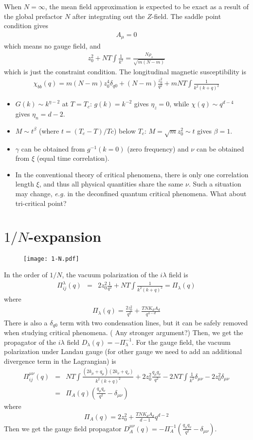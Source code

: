\documentclass[aps,notitlepage]{revtex4-1}
\newcommand{\bea}{\begin{eqnarray}}
\newcommand{\eea}{\end{eqnarray}}
\begin{document}
When $N=\infty$, the mean field approximation is expected to be exact as a result of the global prefactor $N$ after integrating out the $Z$-field. The saddle point condition gives 
\bea A_\mu=0 \eea which means no gauge field, and 
\bea z_0^2 + NT\int \frac{1}{k^2} = \frac{N\rho_s}{\sqrt{m(N-m)}} \eea
which is just the constraint condition.
The longitudinal magnetic susceptibility is
\bea \chi_{bb}(q)= m(N-m) z_0^4\delta_{q0} + (N-m)\frac{z_0^2}{q^2} + mNT\int \frac{1}{k^2(k+q)^2} \eea




\begin{itemize}
	\item $G(k)\sim k^{\eta-2}$ at $T=T_c$: $g(k)=k^{-2}$ gives $\eta_z=0$, while $\chi(q)\sim q^{d-4}$ gives $\eta_n=d-2$.
	\item $M\sim t^\beta$ (where $t=(T_c-T)/Tc$) below $T_c$: $M=\sqrt{m}z_0^2\sim t$ gives $\beta=1$.
  \item $\gamma$ can be obtained from $g^{-1}(k=0)$ (zero frequency) and $\nu$ can be obtained from $\xi$ (equal time correlation).
  \item In the conventional theory of critical phenomena, there is only one correlation length $\xi$, and thus all physical quantities share the same $\nu$. Such a situation may change, \textit{e.g.} in the deconfined quantum critical phenomena. What about tri-critical point?
\end{itemize}

\section{$1/N$-expansion}

\begin{figure}
	\texttt{[image: 1-N.pdf]}
\end{figure}

In the order of $1/N$, the vacuum polarization of the $i\lambda$ field is
\bea \Pi_{ij}^\lambda(q)&=&2z_0^2\frac{1}{q^2} + NT\int \frac{1}{k^2(k+q)^2} = \Pi_\lambda(q) \eea
where \bea \Pi_\lambda(q)=\frac{2z_0^2}{q^2}+\frac{TNK_dA_d}{q^{4-d}} \eea 
There is also a $\delta_{q0}$ term with two condensation lines, but it can be safely removed when studying critical phenomena. ({\color{red} Any stronger argument?}) Then, we get the propagator of the $i\lambda$ field $D_\lambda(q)=-\Pi_\lambda^{-1}$. 
For the gauge field, the vacuum polarization under Landau gauge (for other gauge we need to add an additional divergence term in the Lagrangian) is
\bea \Pi_{ij}^{\mu\nu}(q) &=& NT\int \frac{(2k_\mu+q_\mu)(2k_\nu+q_\nu)}{k^2(k+q)^2} + 2z_0^2 \frac{q_\mu q_\nu}{q^2} - 2NT\int \frac{1}{k^2}\delta_{\mu\nu} - 2z_0^2 \delta_{\mu\nu} \nonumber\\ &=&\Pi_A(q)\left(\frac{q_\mu q_\nu}{q^2}-\delta_{\mu\nu}\right)\eea
where \bea \Pi_A(q)= 2z_0^2+\frac{TNK_dA_d}{d-1} q^{d-2} \eea
Then we get the gauge field propagator $D_A^{\mu\nu}(q)=-\Pi_A^{-1}\left(\frac{q_\mu q_\nu}{q^2}-\delta_{\mu\nu}\right)$. 
\end{document}

